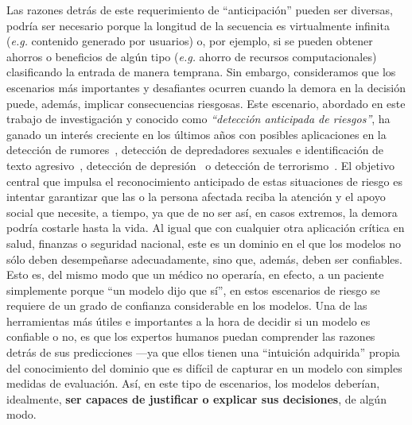 Las razones detrás de este requerimiento de ``anticipación'' pueden ser diversas, podría ser necesario porque la longitud de la secuencia es virtualmente infinita (\emph{e.g.} contenido generado por usuarios) o, por ejemplo, si se pueden obtener ahorros o beneficios de algún tipo (\emph{e.g.} ahorro de recursos computacionales) clasificando la entrada de manera temprana.
Sin embargo, consideramos que los escenarios más importantes y desafiantes ocurren cuando la demora en la decisión puede, además, implicar consecuencias  riesgosas.
Este escenario, abordado en este trabajo de investigación y conocido como \emph{``detección anticipada de riesgos''}, ha ganado un interés creciente en los últimos años con posibles aplicaciones en la detección de rumores~\cite{ma2015detect,ma2016detecting,kwon2017rumor}, detección de depredadores sexuales e identificación de texto agresivo~\cite{escalante2017early}, detección de depresión~\cite{losada2017erisk, losada2016test} o detección de terrorismo~\cite{iskandar2017terrorism}.
El objetivo central que impulsa el reconocimiento anticipado de estas situaciones de riesgo es intentar garantizar que las o la persona afectada reciba la atención y el apoyo social que necesite, a tiempo, ya que de no ser así, en casos extremos, la demora podría costarle hasta la vida.
Al igual que con cualquier otra aplicación crítica en salud, finanzas o seguridad nacional, este es un dominio en el que los modelos no sólo deben desempeñarse adecuadamente, sino que, además, deben ser confiables.
Esto es, del mismo modo que un médico no operaría, en efecto, a un paciente simplemente porque ``un modelo dijo que sí'', en estos escenarios de riesgo se requiere de un grado de confianza considerable en los modelos.
Una de las herramientas más útiles e importantes a la hora de decidir si un modelo es confiable o no, es que los expertos humanos puedan comprender las razones detrás de sus predicciones ---ya que ellos tienen una ``intuición adquirida'' propia del conocimiento del dominio que es difícil de capturar en un modelo con simples medidas de evaluación.
Así, en este tipo de escenarios, los modelos deberían, idealmente, \textbf{ser capaces de justificar o explicar sus decisiones}, de algún modo.

